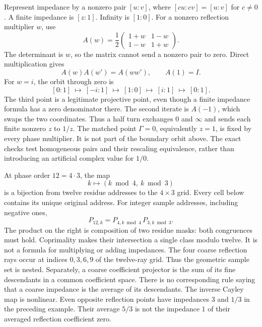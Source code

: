 Represent impedance by a nonzero pair $[u:v]$, where $[cu:cv]=[u:v]$ for $c\ne0$. A finite impedance is $[z:1]$. Infinity is $[1:0]$. For a nonzero reflection multiplier $w$, use
\[
A(w)=\frac12\begin{pmatrix}1+w&1-w\\1-w&1+w\end{pmatrix}.
\]
The determinant is $w$, so the matrix cannot send a nonzero pair to zero. Direct multiplication gives
\[
A(w)A(w')=A(ww'),\qquad A(1)=I.
\]
For $w=i$, the orbit through zero is
\[
[0:1]\ \longmapsto\ [-i:1]\ \longmapsto\ [1:0]
\ \longmapsto\ [i:1]\ \longmapsto\ [0:1].
\]
The third point is a legitimate projective point, even though a finite impedance formula has a zero denominator there. The second iterate is $A(-1)$, which swaps the two coordinates. Thus a half turn exchanges $0$ and $\infty$ and sends each finite nonzero $z$ to $1/z$.
The matched point $\Gamma=0$, equivalently $z=1$, is fixed by every phase multiplier. It is not part of the boundary orbit above. The exact checks test homogeneous pairs and their rescaling equivalence, rather than introducing an artificial complex value for $1/0$.

At phase order $12=4\cdot3$, the map
\[
k\longmapsto(k\bmod4,\ k\bmod3)
\]
is a bijection from twelve residue addresses to the $4\times3$ grid. Every cell below contains its unique original address.
For integer sample addresses, including negative ones,
\[
P_{12,k}=P_{4,k\bmod4}\,P_{3,k\bmod3}.
\]
The product on the right is composition of two residue masks: both congruences must hold. Coprimality makes their intersection a single class modulo twelve. It is not a formula for multiplying or adding impedances.
The four coarse reflection rays occur at indices $0,3,6,9$ of the twelve-ray grid. Thus the geometric sample set is nested. Separately, a coarse coefficient projector is the sum of its fine descendants in a common coefficient space.
There is no corresponding rule saying that a coarse impedance is the average of its descendants. The inverse Cayley map is nonlinear. Even opposite reflection points have impedances $3$ and $1/3$ in the preceding example. Their average $5/3$ is not the impedance $1$ of their averaged reflection coefficient zero.

